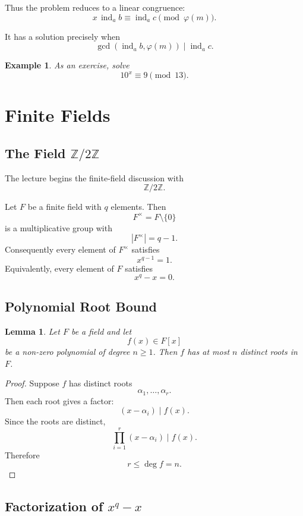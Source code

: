 \documentclass[11pt]{article}
\newtheorem{lemma}[theorem]{Lemma}
\newtheorem{example}[theorem]{Example}
\theoremstyle{remark}
\DeclareMathOperator{\gcdop}{gcd}
\DeclareMathOperator{\ind}{ind}
\newcommand{\Z}{\mathbb Z}
\newcommand{\phiE}{\varphi}
\begin{document}
Thus the problem reduces to a linear congruence:
\[
    \boxed{
    x\,\ind_a b
    \equiv
    \ind_a c
    \pmod{\phiE(m)}
    }.
\]

It has a solution precisely when
\[
    \boxed{
    \gcdop(\ind_a b,\phiE(m))
    \mid
    \ind_a c
    }.
\]

\begin{example}
As an exercise, solve
\[
    10^x\equiv 9\pmod{13}.
\]
\end{example}

\section{Finite Fields}

\subsection{The Field $\Z/2\Z$}

The lecture begins the finite-field discussion with
\[
    \Z/2\Z.
\]

Let $F$ be a finite field with $q$ elements. Then
\[
    F^\times=F\setminus\{0\}
\]
is a multiplicative group with
\[
    |F^\times|=q-1.
\]
Consequently every element of $F^\times$ satisfies
\[
    x^{q-1}=1.
\]
Equivalently, every element of $F$ satisfies
\[
    \boxed{x^q-x=0.}
\]

\subsection{Polynomial Root Bound}

\begin{lemma}
Let $F$ be a field and let
\[
    f(x)\in F[x]
\]
be a non-zero polynomial of degree $n\ge1$. Then $f$ has at most $n$
distinct roots in $F$.
\end{lemma}

\begin{proof}
Suppose $f$ has distinct roots
\[
    \alpha_1,\ldots,\alpha_r.
\]
Then each root gives a factor:
\[
    (x-\alpha_i)\mid f(x).
\]
Since the roots are distinct,
\[
    \prod_{i=1}^r(x-\alpha_i)\mid f(x).
\]
Therefore
\[
    r\le\deg f=n.
\]
\end{proof}

\subsection{Factorization of $x^q-x$}
\end{document}
